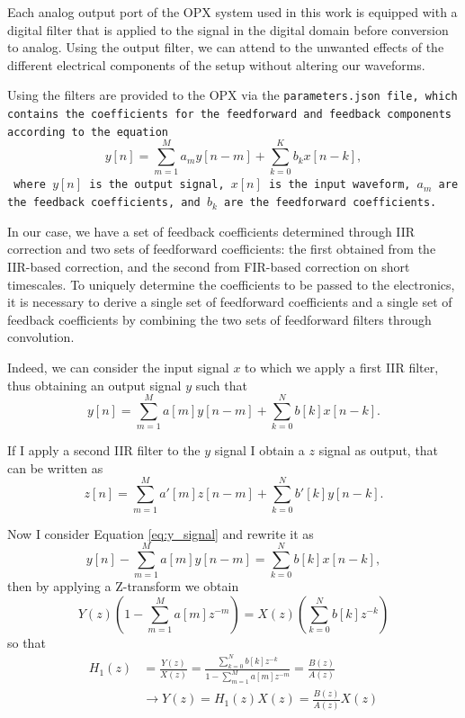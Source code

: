 Each analog output port of the OPX system used in this work is equipped with a digital filter that is applied to the signal in the digital domain before conversion to analog. 
Using the output filter, we can attend to the unwanted effects of the different electrical components of the setup without altering our waveforms.

Using \Qibolab the filters are provided to the OPX via the \tt{parameters.json} file, which contains the coefficients for the feedforward and feedback components according to the equation
\begin{equation}\label{eq:OPX_filter}
    y[n] = \sum_{m=1}^{M} a_m y[n - m] + \sum_{k=0}^{K} b_k x[n - k],
\end{equation}
where $y[n]$ is the output signal, $x[n]$ is the input waveform, $a_m$ are the feedback coefficients, and $b_k$ are the feedforward coefficients.

In our case, we have a set of feedback coefficients determined through IIR correction and two sets of feedforward coefficients: the first obtained from the IIR-based correction, and the second from FIR-based correction on short timescales. 
To uniquely determine the coefficients to be passed to the electronics, it is necessary to derive a single set of feedforward coefficients and a single set of feedback coefficients by combining the two sets of feedforward filters through convolution.

Indeed, we can consider the input signal $x$ to which we apply a first IIR filter, thus obtaining an output signal $y$ such that 
\begin{equation}\label{eq:y_signal}
    y[n] = \sum_{m=1}^{M} a[m]y[n-m] + \sum_{k=0}^{N} b[k] x[n-k].
\end{equation}

If I apply a second IIR filter to the $y$ signal I obtain a $z$ signal as output, that can be written as 
\begin{equation}\label{eq:z_signal}
    z[n] = \sum_{m=1}^{M} a'[m]z[n-m] + \sum_{k=0}^{N} b'[k] y[n-k].
\end{equation}

Now I consider Equation \ref{eq:y_signal} and rewrite it as
\begin{equation}\label{eq:y_signal1}
    y[n] - \sum_{m=1}^{M} a[m]y[n-m] = \sum_{k=0}^{N} b[k] x[n-k],
\end{equation} 
then by applying a Z-transform we obtain
\begin{equation}\label{eq:y_signal_transform}
    Y(z)\left(1 - \sum_{m=1}^{M} a[m] z^{-m} \right) = X(z) \left( \sum_{k=0}^{N} b[k] z^{-k} \right)
\end{equation}
so that 
\begin{align}
    H_1(z) &= \frac{Y(z)}{X(z)} = \frac{\sum_{k=0}^{N} b[k] z^{-k}}{1 - \sum_{m=1}^{M} a[m] z^{-m}} = \frac{B(z)}{A(z)} \\
    & \rightarrow Y(z) = H_1(z)X(z) = \frac{B(z)}{A(z)}X(z) \label{eq:transfer1}
\end{align}

